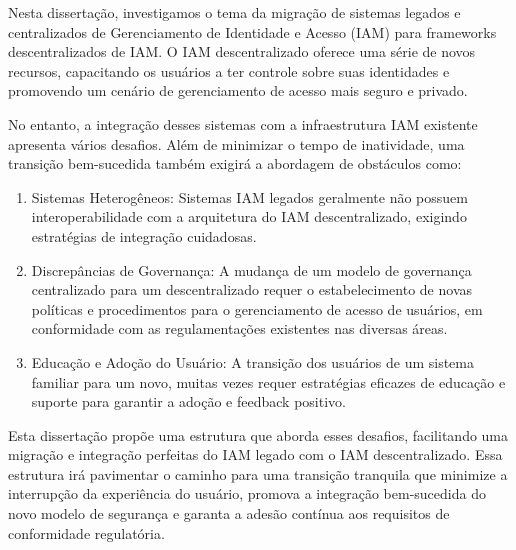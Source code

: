 
%

Nesta dissertação, investigamos o tema da migração de sistemas legados e centralizados de Gerenciamento de 
Identidade e Acesso (IAM) para frameworks descentralizados de IAM. 
O IAM descentralizado oferece uma série de novos recursos, capacitando os usuários a ter controle sobre 
suas identidades e promovendo um cenário de gerenciamento de acesso mais seguro e privado.

No entanto, a integração desses sistemas com a infraestrutura IAM existente apresenta vários desafios. 
Além de minimizar o tempo de inatividade, uma transição bem-sucedida também exigirá a abordagem de 
obstáculos como:

\begin{enumerate}
  \item Sistemas Heterogêneos: Sistemas IAM legados geralmente não possuem interoperabilidade com a 
  arquitetura do IAM descentralizado, exigindo estratégias de integração cuidadosas.
  \item Discrepâncias de Governança: A mudança de um modelo de governança centralizado para um 
  descentralizado requer o estabelecimento de novas políticas e procedimentos para o gerenciamento de acesso de usuários, em conformidade com as regulamentações existentes nas diversas áreas.
  \item Educação e Adoção do Usuário: A transição dos usuários de um sistema familiar para um novo, 
  muitas vezes requer estratégias eficazes de educação e suporte para garantir a adoção e feedback positivo.
\end{enumerate}

Esta dissertação propõe uma estrutura que aborda esses desafios, facilitando uma migração e 
integração perfeitas do IAM legado com o IAM descentralizado. 
Essa estrutura irá pavimentar o caminho para uma transição tranquila que minimize a 
interrupção da experiência do usuário, promova a integração bem-sucedida do novo modelo de 
segurança e garanta a adesão contínua aos requisitos de conformidade regulatória.
%
%

